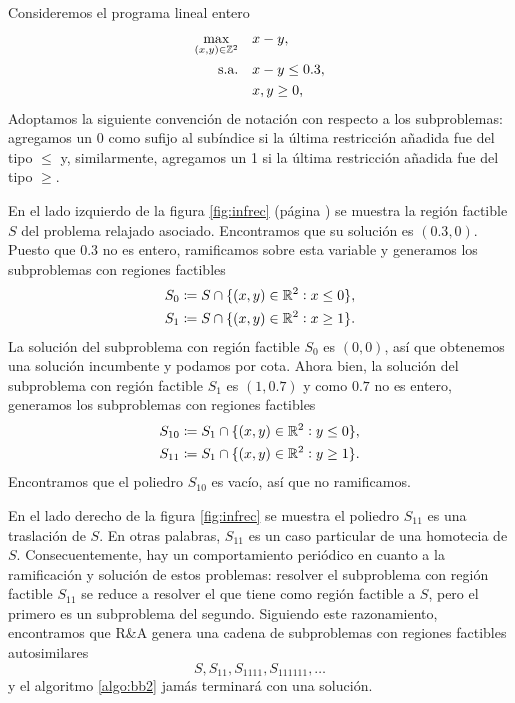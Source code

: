 \begin{example}
	\label{ex:inf}
	Consideremos el programa lineal entero
	\begin{align*}
		\max_{(x, y) \in \mathbb{Z}^2} \quad
			& x - y, \\
		\text{s.a.} \quad
			& x - y \leq 0.3, \\
			& x, y \geq 0,
	\end{align*}
	Adoptamos la siguiente convención de notación con respecto a los subproblemas: agregamos un 0
	como sufijo al subíndice si la última restricción añadida fue del tipo $\leq$ y, similarmente,
	agregamos un 1 si la última restricción añadida fue del tipo $\geq$.

	En el lado izquierdo de la figura \ref{fig:infrec} (página \pageref{fig:infrec}) se muestra la
	región factible $S$ del problema relajado asociado. Encontramos que su solución es $(0.3, 0)$.
	Puesto que $0.3$ no es entero, ramificamos sobre esta variable y generamos los subproblemas
	con regiones factibles
	\begin{align*}
		S_0 &\coloneq S \cap \lbrace (x, y) \in \mathbb{R}^2 \vcentcolon x \leq 0 \rbrace, \\
		S_1 &\coloneq S \cap \lbrace (x, y) \in \mathbb{R}^2 \vcentcolon x \geq 1 \rbrace.
	\end{align*}
	La solución del subproblema con región factible $S_{0}$ es $(0, 0)$, así que obtenemos una
	solución incumbente y podamos por cota. Ahora bien, la solución del subproblema con región
	factible $S_{1}$ es $(1, 0.7)$ y como $0.7$ no es entero, generamos los subproblemas con
	regiones factibles
	\begin{align*}
		S_{10} &\coloneq S_1 \cap \lbrace (x, y) \in \mathbb{R}^2 \vcentcolon y \leq 0 \rbrace, \\
		S_{11} &\coloneq S_1 \cap \lbrace (x, y) \in \mathbb{R}^2 \vcentcolon y \geq 1 \rbrace.
	\end{align*}
	Encontramos que el poliedro $S_{10}$ es vacío, así que no ramificamos.

	En el lado derecho de la figura \ref{fig:infrec} se muestra el poliedro $S_{11}$ es una
	traslación de $S$. En otras palabras, $S_{11}$ es un caso particular de una homotecia de $S$.
	Consecuentemente, hay un comportamiento periódico en cuanto a la ramificación y solución de
	estos problemas: resolver el subproblema con región factible $S_{11}$ se reduce a resolver el
	que tiene como región factible a  $S$, pero el primero es un subproblema del segundo. Siguiendo
	este razonamiento, encontramos que R\&A genera una cadena de subproblemas con regiones factibles
	autosimilares
	\begin{equation*}
		S, S_{11}, S_{1111}, S_{111111}, \ldots
	\end{equation*}
	y el algoritmo \ref{algo:bb2} jamás terminará con una solución.
\end{example}

